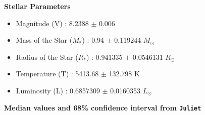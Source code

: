 \documentclass[12pt, a4paper]{book}
\begin{document}
\newpage
\begin{center}
{\large \textbf{Stellar Parameters}}
\end{center}
\begin{itemize}
\item Magnitude (V) :  8.2388 $\pm$ 0.006
\item Mass of the Star ($M_*$) :  0.94 $\pm$ 0.119244 $M_\odot$
\item Radius of the Star ($R_*$) :  0.941335 $\pm$ 0.0546131 $R_\odot$
\item Temperature (T) :  5413.68 $\pm$ 132.798 K
\item Luminosity (L) :  0.6857309 $\pm$ 0.0160353 $L_\odot$
\end{itemize}
\vspace*{0.6cm}
\begin{center}
{\large \textbf{Median values and 68\% confidence interval from \texttt{Juliet}}}
\end{center}
 
\end{document}
